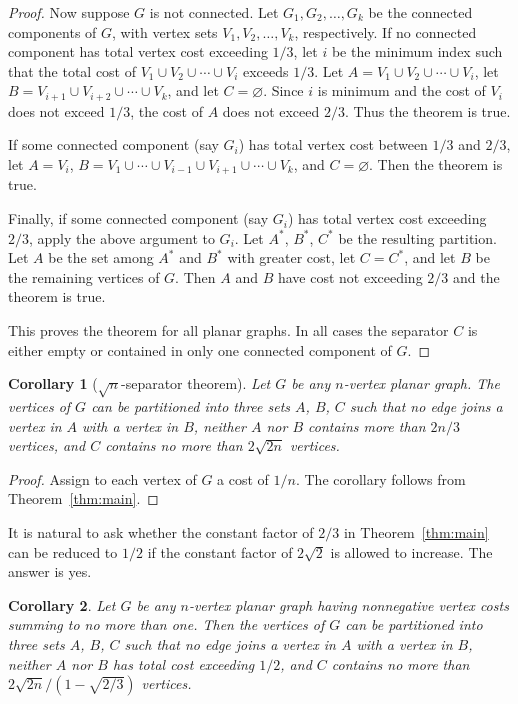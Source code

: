 \documentclass[12pt]{article}
\newtheorem{corollary}{Corollary}
\theoremstyle{remark}
\begin{document}
\begin{proof}
Now suppose $G$ is not connected. Let $G_1, G_2, \ldots, G_k$ be the connected
components of $G$, with vertex sets $V_1, V_2, \ldots, V_k$, respectively. If no
connected component has total vertex cost exceeding $1/3$, let $i$ be the minimum
index such that the total cost of $V_1 \cup V_2 \cup \cdots \cup V_i$ exceeds $1/3$.
Let $A = V_1 \cup V_2 \cup \cdots \cup V_i$, let
$B = V_{i+1} \cup V_{i+2} \cup \cdots \cup V_k$, and let $C = \varnothing$. Since
$i$ is minimum and the cost of $V_i$ does not exceed $1/3$, the cost of $A$ does not
exceed $2/3$. Thus the theorem is true.

If some connected component (say $G_i$) has total vertex cost between $1/3$ and
$2/3$, let $A = V_i$,
$B = V_1 \cup \cdots \cup V_{i-1} \cup V_{i+1} \cup \cdots \cup V_k$, and
$C = \varnothing$. Then the theorem is true.

Finally, if some connected component (say $G_i$) has total vertex cost exceeding
$2/3$, apply the above argument to $G_i$. Let $A^*$, $B^*$, $C^*$ be the resulting
partition. Let $A$ be the set among $A^*$ and $B^*$ with greater cost, let $C = C^*$,
and let $B$ be the remaining vertices of $G$. Then $A$ and $B$ have cost not
exceeding $2/3$ and the theorem is true.

This proves the theorem for all planar graphs. In all cases the separator $C$ is
either empty or contained in only one connected component of $G$.
\end{proof}

\begin{corollary}[$\sqrt{n}$-separator theorem]
\label{cor:sqrt-sep}
Let $G$ be any $n$-vertex planar graph. The vertices of $G$ can be partitioned into
three sets $A$, $B$, $C$ such that no edge joins a vertex in $A$ with a vertex in $B$,
neither $A$ nor $B$ contains more than $2n/3$ vertices, and $C$ contains no more
than $2\sqrt{2n}$ vertices.
\end{corollary}

\begin{proof}
Assign to each vertex of $G$ a cost of $1/n$. The corollary follows from
Theorem~\ref{thm:main}.
\end{proof}

It is natural to ask whether the constant factor of $2/3$ in
Theorem~\ref{thm:main} can be reduced to $1/2$ if the constant factor of $2\sqrt{2}$
is allowed to increase. The answer is yes.

\begin{corollary}
\label{cor:half-sep}
Let $G$ be any $n$-vertex planar graph having nonnegative vertex costs summing to
no more than one. Then the vertices of $G$ can be partitioned into three sets $A$,
$B$, $C$ such that no edge joins a vertex in $A$ with a vertex in $B$, neither $A$
nor $B$ has total cost exceeding $1/2$, and $C$ contains no more than
$2\sqrt{2n}/(1 - \sqrt{2/3})$ vertices.
\end{corollary}
\end{document}
